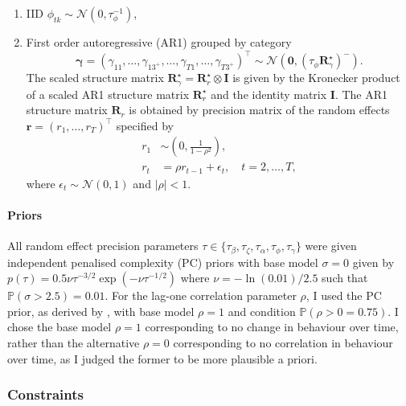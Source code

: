 \documentclass[a4paper, nobind]{templates/ociamthesis}
\providecommand{\tightlist}{%
  \setlength{\itemsep}{0pt}\setlength{\parskip}{0pt}}
\begin{document}
\begin{enumerate}
\def\labelenumi{\arabic{enumi}.}
\tightlist
\item
  IID \(\phi_{tk} \sim \mathcal{N}(0, \tau_\phi^{-1})\),
\item
  First order autoregressive (AR1) grouped by category
  \[
  \bm{\gamma} = (\gamma_{11}, \ldots, \gamma_{13^{+}}, \ldots, \gamma_{T1}, \ldots, \gamma_{T3^{+}})^\top \sim \mathcal{N}(\mathbf{0}, (\tau_\phi \mathbf{R}^\star_\gamma)^{-}).
  \]
  The scaled structure matrix \(\mathbf{R}^\star_\gamma = \mathbf{R}^\star_r \otimes \mathbf{I}\) is given by the Kronecker product of a scaled AR1 structure matrix \(\mathbf{R}^\star_r\) and the identity matrix \(\mathbf{I}\).
  The AR1 structure matrix \(\mathbf{R}_r\) is obtained by precision matrix of the random effects \(\mathbf{r} = (r_1, \ldots, r_T)^\top\) specified by
  \begin{align}
  r_1 &\sim \left( 0, \frac{1}{1 - \rho^2} \right), \\
  r_t &= \rho r_{t - 1} + \epsilon_t, \quad t = 2, \ldots, T, 
  \end{align}
  where \(\epsilon_t \sim \mathcal{N}(0, 1)\) and \(|\rho| < 1\).
\end{enumerate}

\hypertarget{priors}{%
\paragraph{Priors}\label{priors}}

All random effect precision parameters \(\tau \in \{\tau_\beta, \tau_\zeta, \tau_\alpha, \tau_\phi, \tau_\gamma\}\) were given independent penalised complexity (PC) priors \autocite{simpson2017penalising} with base model \(\sigma = 0\) given by \(p(\tau) = 0.5 \nu \tau^{-3/2} \exp \left( - \nu \tau^{-1/2} \right)\) where \(\nu = - \ln(0.01) / 2.5\) such that \(\mathbb{P}(\sigma > 2.5) = 0.01\).
For the lag-one correlation parameter \(\rho\), I used the PC prior, as derived by \textcite{sorbye2017penalised}, with base model \(\rho = 1\) and condition \(\mathbb{P}(\rho > 0 = 0.75)\).
I chose the base model \(\rho = 1\) corresponding to no change in behaviour over time, rather than the alternative \(\rho = 0\) corresponding to no correlation in behaviour over time, as I judged the former to be more plausible a priori.

\hypertarget{constraints}{%
\subsubsection{Constraints}\label{constraints}}
\end{document}
